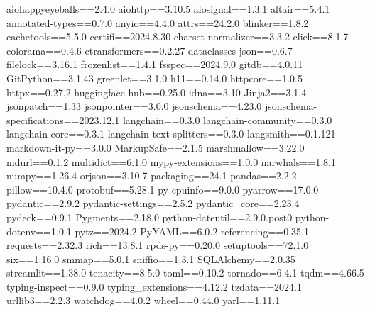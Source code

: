 aiohappyeyeballs==2.4.0
aiohttp==3.10.5
aiosignal==1.3.1
altair==5.4.1
annotated-types==0.7.0
anyio==4.4.0
attrs==24.2.0
blinker==1.8.2
cachetools==5.5.0
certifi==2024.8.30
charset-normalizer==3.3.2
click==8.1.7
colorama==0.4.6
ctransformers==0.2.27
dataclasses-json==0.6.7
filelock==3.16.1
frozenlist==1.4.1
fsspec==2024.9.0
gitdb==4.0.11
GitPython==3.1.43
greenlet==3.1.0
h11==0.14.0
httpcore==1.0.5
httpx==0.27.2
huggingface-hub==0.25.0
idna==3.10
Jinja2==3.1.4
jsonpatch==1.33
jsonpointer==3.0.0
jsonschema==4.23.0
jsonschema-specifications==2023.12.1
langchain==0.3.0
langchain-community==0.3.0
langchain-core==0.3.1
langchain-text-splitters==0.3.0
langsmith==0.1.121
markdown-it-py==3.0.0
MarkupSafe==2.1.5
marshmallow==3.22.0
mdurl==0.1.2
multidict==6.1.0
mypy-extensions==1.0.0
narwhals==1.8.1
numpy==1.26.4
orjson==3.10.7
packaging==24.1
pandas==2.2.2
pillow==10.4.0
protobuf==5.28.1
py-cpuinfo==9.0.0
pyarrow==17.0.0
pydantic==2.9.2
pydantic-settings==2.5.2
pydantic_core==2.23.4
pydeck==0.9.1
Pygments==2.18.0
python-dateutil==2.9.0.post0
python-dotenv==1.0.1
pytz==2024.2
PyYAML==6.0.2
referencing==0.35.1
requests==2.32.3
rich==13.8.1
rpds-py==0.20.0
setuptools==72.1.0
six==1.16.0
smmap==5.0.1
sniffio==1.3.1
SQLAlchemy==2.0.35
streamlit==1.38.0
tenacity==8.5.0
toml==0.10.2
tornado==6.4.1
tqdm==4.66.5
typing-inspect==0.9.0
typing_extensions==4.12.2
tzdata==2024.1
urllib3==2.2.3
watchdog==4.0.2
wheel==0.44.0
yarl==1.11.1
